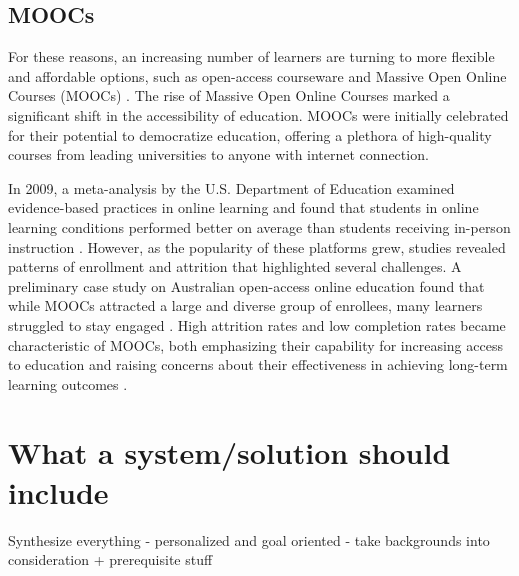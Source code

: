 \subsection{MOOCs}
For these reasons, an increasing number of learners are turning to more flexible and affordable options, such as open-access courseware and Massive Open Online Courses (MOOCs) \cite{harish:2013} \cite{papmpouri:2021}. The rise of Massive Open Online Courses marked a significant shift in the accessibility of education. MOOCs were initially celebrated for their potential to democratize education, offering a plethora of high-quality courses from leading universities to anyone with internet connection. 

In 2009, a meta-analysis by the U.S. Department of Education examined evidence-based practices in online learning and found that students in online learning conditions performed better on average than students receiving in-person instruction \cite{means:2009}. However, as the popularity of these platforms grew, studies revealed patterns of enrollment and attrition that highlighted several challenges. A preliminary case study on Australian open-access online education found that while MOOCs attracted a large and diverse group of enrollees, many learners struggled to stay engaged \cite{greenland:2014}. High attrition rates and low completion rates became characteristic of MOOCs, both emphasizing their capability for increasing access to education and raising concerns about their effectiveness in achieving long-term learning outcomes \cite{clow:2013}. 

\section{What a system/solution should include}

Synthesize everything 
- personalized and goal oriented
- take backgrounds into consideration + prerequisite stuff 
